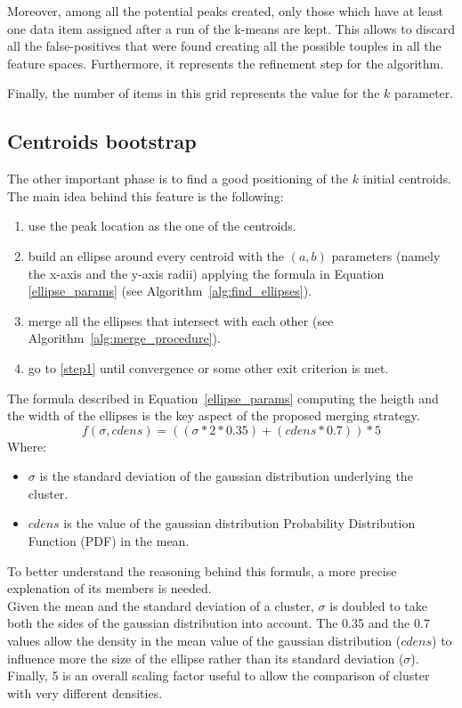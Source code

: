 Moreover, among all the potential peaks created, only those which have at least one data
item assigned after a run of the k-means are kept. This allows to discard all the 
false-positives that were found creating all the possible touples in all the feature spaces.
Furthermore, it represents the refinement step for the algorithm.

Finally, the number of items in this grid represents the value for the $k$ parameter.


\subsection{Centroids bootstrap}
The other important phase is to find a good positioning of the $k$ initial centroids.
The main idea behind this feature is the following:
\begin{enumerate}
    \item \label{step1} use the peak location as the one of the centroids.
    \item build an ellipse around every centroid with the $(a,b)$ parameters (namely the x-axis
        and the y-axis radii) applying the formula in Equation \ref{ellipse_params} (see
        Algorithm~\ref{alg:find_ellipses}).
    \item merge all the ellipses that intersect with each other (see 
        Algorithm~\ref{alg:merge_procedure}).
    \item go to \ref{step1} until convergence or some other exit criterion is met.
\end{enumerate}




The formula described in Equation~\ref{ellipse_params} computing the heigth and the width of 
the ellipses is the key aspect of the proposed merging strategy.
\begin{equation}
\label{ellipse_params}
    f(\sigma, cdens) = ((\sigma * 2 * 0.35) + (cdens * 0.7)) * 5
\end{equation}
Where:
\begin{itemize}
    \item $\sigma$ is the standard deviation of the gaussian distribution underlying the cluster.
    \item $cdens$ is the value of the gaussian distribution Probability Distribution Function (PDF)
        in the mean.
\end{itemize}

To better understand the reasoning behind this formuls, a more precise explenation of its members
is needed.\\
Given the mean and the standard deviation of a cluster, 
$\sigma$ is doubled to take both the sides of the gaussian distribution into account.
The 0.35 and the 0.7 values allow the density in the mean value of the gaussian distribution ($cdens$) 
to influence more the size of the ellipse rather than its standard deviation ($\sigma$). Finally, 5 is
an overall scaling factor useful to allow the comparison of cluster with very different densities.

